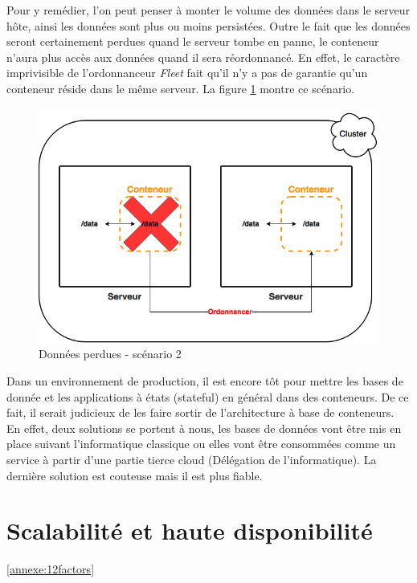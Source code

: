 \begin{onehalfspace}
Pour y remédier, l'on peut penser à monter le volume des données dans le serveur hôte, ainsi les données sont plus ou moins persistées. Outre le fait que les données seront certainement perdues quand le serveur tombe en panne, le conteneur n'aura plus accès aux données quand il sera réordonnancé. En effet, le caractère imprivisible de l'ordonnanceur \emph{Fleet} fait qu'il n'y a pas de garantie qu'un conteneur réside dans le même serveur. La figure \ref{fig:database2} montre ce scénario.

\begin{figure}[H]
\centering
\includegraphics [scale=0.5]{chapitre4/assets/database2}
\caption{Données perdues - scénario 2}
\label{fig:database2}
\end{figure}


Dans un environnement de production, il est encore tôt pour mettre les bases de donnée et les applications à états (stateful) en général dans des conteneurs. De ce fait, il serait judicieux de les faire sortir de l'architecture à base de conteneurs. En effet, deux solutions se portent à nous, les bases de données vont être mis en place suivant l'informatique classique ou elles vont être consommées comme un service à partir d'une partie tierce cloud (Délégation de l'informatique). La dernière solution est couteuse mais il est plus fiable.



\section{Scalabilité et haute disponibilité}



\ref{annexe:12factors}



\end{onehalfspace}
